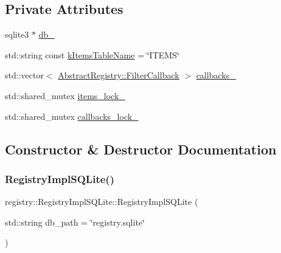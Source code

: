 \subsection*{Private Attributes}
\begin{DoxyCompactItemize}
\item 
sqlite3 $\ast$ \hyperlink{classregistry_1_1RegistryImplSQLite_af79b30f624a35f84e585a72b2212d5fc}{db\+\_\+}
\item 
std\+::string const \hyperlink{classregistry_1_1RegistryImplSQLite_abe58267856da3b53b03834a2b177007d}{k\+Items\+Table\+Name} = \char`\"{}I\+T\+E\+MS\char`\"{}
\item 
std\+::vector$<$ \hyperlink{classregistry_1_1AbstractRegistry_a31f6bef634dcd324efebaf55f99b950f}{Abstract\+Registry\+::\+Filter\+Callback} $>$ \hyperlink{classregistry_1_1RegistryImplSQLite_a39709978c5bc5828fee650690aa9d8ad}{callbacks\+\_\+}
\item 
std\+::shared\+\_\+mutex \hyperlink{classregistry_1_1RegistryImplSQLite_a7c0db71680eb0ccd8b24d315e5b6b053}{items\+\_\+lock\+\_\+}
\item 
std\+::shared\+\_\+mutex \hyperlink{classregistry_1_1RegistryImplSQLite_ac6bcca9380e8c6ba7cef152392043ebd}{callbacks\+\_\+lock\+\_\+}
\end{DoxyCompactItemize}


\subsection{Constructor \& Destructor Documentation}
\mbox{\label{classregistry_1_1RegistryImplSQLite_ad211242bf6438adad6ad01c3d5863f6f}} 
\subsubsection{\texorpdfstring{Registry\+Impl\+S\+Q\+Lite()}{RegistryImplSQLite()}}
{\footnotesize\ttfamily registry\+::\+Registry\+Impl\+S\+Q\+Lite\+::\+Registry\+Impl\+S\+Q\+Lite (\begin{DoxyParamCaption}\item[{std\+::string}]{db\+\_\+path = {\ttfamily \char`\"{}registry.sqlite\char`\"{}} }\end{DoxyParamCaption})\hspace{0.3cm}{\ttfamily [inline]}}

